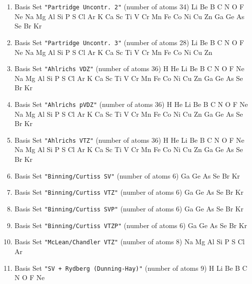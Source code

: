 \begin{enumerate}
\item Basis Set \verb#"Partridge Uncontr. 2"# (number of atoms 34) \newline
  Li Be B C N O F Ne Na Mg Al Si P S Cl Ar K Ca Sc Ti V Cr Mn Fe Co
 Ni Cu Zn Ga Ge As Se Br Kr


\item Basis Set \verb#"Partridge Uncontr. 3"# (number of atoms 28) \newline
  Li Be B C N O F Ne Na Mg Al Si P S Cl Ar K Ca Sc Ti V Cr Mn Fe Co
 Ni Cu Zn


\item Basis Set \verb#"Ahlrichs VDZ"# (number of atoms 36) \newline
  H He Li Be B C N O F Ne Na Mg Al Si P S Cl Ar K Ca Sc Ti V Cr Mn
 Fe Co Ni Cu Zn Ga Ge As Se Br Kr


\item Basis Set \verb#"Ahlrichs pVDZ"# (number of atoms 36) \newline
  H He Li Be B C N O F Ne Na Mg Al Si P S Cl Ar K Ca Sc Ti V Cr Mn
 Fe Co Ni Cu Zn Ga Ge As Se Br Kr


\item Basis Set \verb#"Ahlrichs VTZ"# (number of atoms 36) \newline
  H He Li Be B C N O F Ne Na Mg Al Si P S Cl Ar K Ca Sc Ti V Cr Mn
 Fe Co Ni Cu Zn Ga Ge As Se Br Kr


\item Basis Set \verb#"Binning/Curtiss SV"# (number of atoms 6) \newline
  Ga Ge As Se Br Kr


\item Basis Set \verb#"Binning/Curtiss VTZ"# (number of atoms 6) \newline
  Ga Ge As Se Br Kr


\item Basis Set \verb#"Binning/Curtiss SVP"# (number of atoms 6) \newline
  Ga Ge As Se Br Kr


\item Basis Set \verb#"Binning/Curtiss VTZP"# (number of atoms 6) \newline
  Ga Ge As Se Br Kr


\item Basis Set \verb#"McLean/Chandler VTZ"# (number of atoms 8) \newline
  Na Mg Al Si P S Cl Ar


\item Basis Set \verb#"SV + Rydberg (Dunning-Hay)"# (number of atoms 9) \newline
  H Li Be B C N O F Ne



\end{enumerate}
